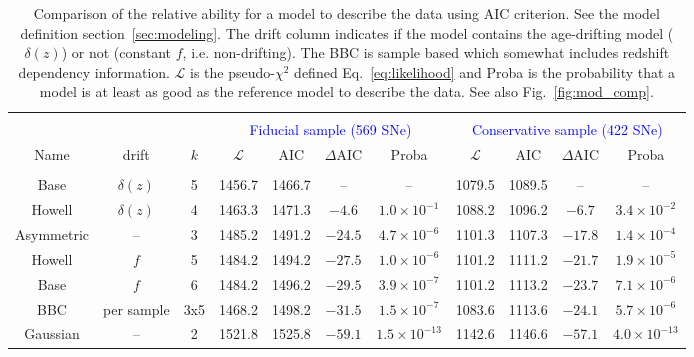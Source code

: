 \documentclass[]{aa} %
\newcommand{\yc}[1]{{\textcolor{blue}{#1}}}
\begin{document}
\begin{table}
    \centering
    \caption{Comparison of the relative ability for a model to describe the data
        using AIC criterion. See the model definition
        section~\ref{sec:modeling}. The drift column indicates if the model
        contains the age-drifting model ($\delta(z)$) or not (constant $f$, i.e.
        non-drifting). The BBC is sample based which somewhat includes
        redshift dependency information. $\mathcal{L}$ is the pseudo-$\chi^{2}$
        defined Eq.~\ref{eq:likelihood} and Proba is the probability that a
        model is at least as good as the reference model to describe the data.
    See also Fig.~\ref{fig:mod_comp}.}
    \label{tab:comp}
    \begin{tabular}{c c c  |c c c c|  c c c c}\hline\hline\\[-0.8em]
        & & & \multicolumn{4}{|c}{\yc{Fiducial sample (569 SNe)}} & \multicolumn{4}{|c}{\yc{Conservative sample (422 SNe)}} \\
        
        Name & drift & $k$ &
        $\mathcal{L}$ & $\mathrm{AIC}$ & $\Delta \mathrm{AIC}$ & Proba & $\mathcal{L}$ & $\mathrm{AIC}$ & $\Delta \mathrm{AIC}$ & Proba \\[0.15em]
        \hline\\[-0.8em]

        Base & $\delta(z)$ & 5
        & 1456.7 & 1466.7 & -- & --
        & 1079.5 & 1089.5 & -- & --\\[0.15em]

        Howell & $\delta(z)$ & 4
        & 1463.3 & 1471.3 & $-4.6$ & $1.0\times10^{-1}$
        & 1088.2 & 1096.2 & $-6.7$ & $3.4\times10^{-2}$\\[0.15em]

        Asymmetric & -- & 3
        & 1485.2 & 1491.2 & $-24.5$ & $4.7\times10^{-6}$
        & 1101.3 & 1107.3 & $-17.8$ & $1.4\times10^{-4}$\\[0.15em]

        Howell & $f$ & 5
        & 1484.2 & 1494.2 & $-27.5$ & $1.0\times10^{-6}$
        & 1101.2 & 1111.2 & $-21.7$ & $1.9\times10^{-5}$\\[0.15em]

        Base & $f$ & 6
        & 1484.2 & 1496.2 & $-29.5$ & $3.9\times10^{-7}$
        & 1101.2 & 1113.2 & $-23.7$ & $7.1\times10^{-6}$\\[0.15em]

        BBC & per sample & 3x5
        & 1468.2 & 1498.2 & $-31.5$ & $1.5\times10^{-7}$
        & 1083.6 & 1113.6 & $-24.1$ & $5.7\times10^{-6}$\\[0.15em]

        Gaussian & -- & 2
        & 1521.8 & 1525.8 & $-59.1$ & $1.5\times10^{-13}$
        & 1142.6 & 1146.6 & $-57.1$ & $4.0\times10^{-13}$ \\\hline\hline
    \end{tabular}
\end{table}
\end{document}
